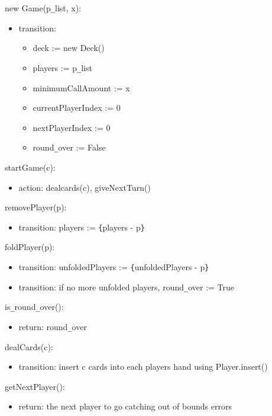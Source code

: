 \documentclass[12pt, titlepage]{article}
\begin{document}
\noindent new Game(p\verb|_|list, x):
\begin{itemize}
\item transition:
    \begin{itemize}
        \item deck := new Deck()
        \item players := p\verb|_|list
        \item minimumCallAmount := x
        \item currentPlayerIndex := 0
        \item nextPlayerIndex := 0
        \item round\verb|_|over := False
    \end{itemize}
\end{itemize}

\noindent startGame(c):
\begin{itemize}
\item action: dealcards(c), giveNextTurn()
\end{itemize}

\noindent removePlayer(p):
\begin{itemize}
\item transition: players := \verb|{|players - p\verb|}|\\
\end{itemize}

\noindent foldPlayer(p):
\begin{itemize}
\item transition: unfoldedPlayers := \verb|{|unfoldedPlayers - p\verb|}|\\
\item transition: if no more unfolded players, round\verb|_|over := True
\end{itemize}

\noindent is\verb|_|round\verb|_|over():
\begin{itemize}
    \item return: round\verb|_|over
\end{itemize}

\noindent dealCards(c):
\begin{itemize}
    \item transition: insert c cards into each players hand using Player.insert()
\end{itemize}

\noindent getNextPlayer():
\begin{itemize}
    \item return: the next player to go
    \exception catching out of bounds errors
\end{itemize}
\end{document}
